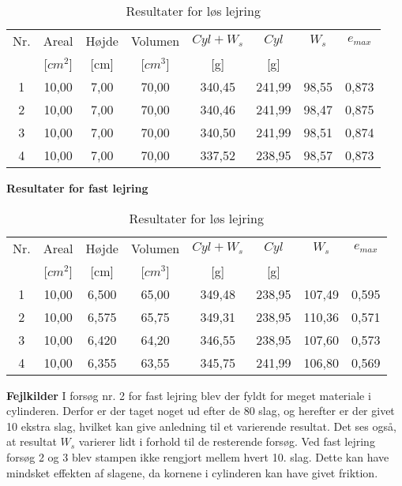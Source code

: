 \begin{table} [H]
\begin{center}
	\begin{tabular}{ c c c c c c c c } 
		\hline
		Nr. & Areal & Højde & Volumen & $Cyl + W_s$ & $Cyl$ & $W_s$ & $e_{max}$ \\
		& [$cm^2$] & [cm] & [$cm^3$] & [g] & [g] & \\ \hline
		1 & 10,00 & 7,00 & 70,00 & 340,45 & 241,99 & 98,55 & 0,873 \\
		2 & 10,00 & 7,00 & 70,00 & 340,46 & 241,99 & 98,47 & 0,875 \\
		3 & 10,00 & 7,00 & 70,00 & 340,50 & 241,99 & 98,51 & 0,874 \\
		4 & 10,00 & 7,00 & 70,00 & 337,52 & 238,95 & 98,57 & 0,873 \\
	\end{tabular}
	\caption{Resultater for løs lejring}
	\label{tab:bilagd1}
\end{center}
\end{table}

\textbf{Resultater for fast lejring}
\begin{table} [H]
	\begin{center}
		\begin{tabular}{ c c c c c c c c } 
			\hline
			Nr. & Areal & Højde & Volumen & $Cyl + W_s$ & $Cyl$ & $W_s$ & $e_{max}$ \\
			& [$cm^2$] & [cm] & [$cm^3$] & [g] & [g] & \\ \hline
			1 & 10,00 & 6,500 & 65,00 & 349,48 & 238,95 & 107,49 & 0,595 \\
			2 & 10,00 & 6,575 & 65,75 & 349,31 & 238,95 & 110,36 & 0,571 \\
			3 & 10,00 & 6,420 & 64,20 & 346,55 & 238,95 & 107,60 & 0,573 \\
			4 & 10,00 & 6,355 & 63,55 & 345,75 & 241,99 & 106,80 & 0,569 \\
		\end{tabular}
		\caption{Resultater for løs lejring}
		\label{tab:bilagd2}
	\end{center}
\end{table}

\textbf{Fejlkilder}
\newline
I forsøg nr. 2 for fast lejring blev der fyldt for meget materiale i cylinderen. Derfor er der taget noget ud efter de 80 slag, og herefter er der givet 10 ekstra slag, hvilket kan give anledning til et varierende resultat. Det ses også, at resultat $W_s$ varierer lidt i forhold til de resterende forsøg.
\newline \indent{     }  Ved fast lejring forsøg 2 og 3 blev stampen ikke rengjort mellem hvert 10. slag. Dette kan have mindsket effekten af slagene, da kornene i cylinderen kan have givet friktion.